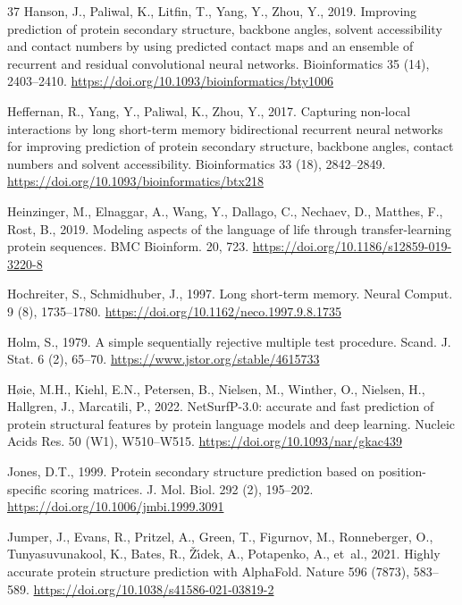 \documentclass[preprint,12pt,authoryear]{elsarticle}
\begin{document}
\begin{thebibliography}{37}
Hanson, J., Paliwal, K., Litfin, T., Yang, Y., Zhou, Y., 2019. Improving prediction of protein secondary structure, backbone angles, solvent accessibility and contact numbers by using predicted contact maps and an ensemble of recurrent and residual convolutional neural networks. Bioinformatics 35 (14), 2403--2410. \url{https://doi.org/10.1093/bioinformatics/bty1006}

Heffernan, R., Yang, Y., Paliwal, K., Zhou, Y., 2017. Capturing non-local interactions by long short-term memory bidirectional recurrent neural networks for improving prediction of protein secondary structure, backbone angles, contact numbers and solvent accessibility. Bioinformatics 33 (18), 2842--2849. \url{https://doi.org/10.1093/bioinformatics/btx218}

Heinzinger, M., Elnaggar, A., Wang, Y., Dallago, C., Nechaev, D., Matthes, F., Rost, B., 2019. Modeling aspects of the language of life through transfer-learning protein sequences. BMC Bioinform. 20, 723. \url{https://doi.org/10.1186/s12859-019-3220-8}

Hochreiter, S., Schmidhuber, J., 1997. Long short-term memory. Neural Comput. 9 (8), 1735--1780. \url{https://doi.org/10.1162/neco.1997.9.8.1735}

Holm, S., 1979. A simple sequentially rejective multiple test procedure. Scand. J. Stat. 6 (2), 65--70. \url{https://www.jstor.org/stable/4615733}

H{\o}ie, M.H., Kiehl, E.N., Petersen, B., Nielsen, M., Winther, O., Nielsen, H., Hallgren, J., Marcatili, P., 2022. NetSurfP-3.0: accurate and fast prediction of protein structural features by protein language models and deep learning. Nucleic Acids Res. 50 (W1), W510--W515. \url{https://doi.org/10.1093/nar/gkac439}

Jones, D.T., 1999. Protein secondary structure prediction based on position-specific scoring matrices. J. Mol. Biol. 292 (2), 195--202. \url{https://doi.org/10.1006/jmbi.1999.3091}

Jumper, J., Evans, R., Pritzel, A., Green, T., Figurnov, M., Ronneberger, O., Tunyasuvunakool, K., Bates, R., {\v{Z}}{\'\i}dek, A., Potapenko, A., et~al., 2021. Highly accurate protein structure prediction with AlphaFold. Nature 596 (7873), 583--589. \url{https://doi.org/10.1038/s41586-021-03819-2}


\end{thebibliography}
\end{document}
